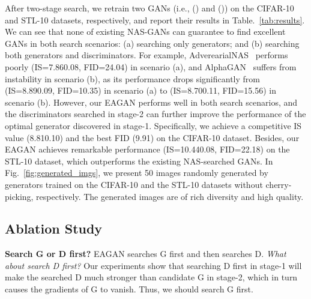 \documentclass[runningheads]{llncs}
\begin{document}
After two-stage search, we retrain two GANs (i.e., () and ()) on the CIFAR-10 and STL-10 datasets, respectively, and report their results in Table.~\ref{tab:results}. We can see that none of existing NAS-GANs can guarantee to find excellent GANs in both search scenarios: (a) searching only generators; and (b) searching both generators and discriminators. For example, AdverearialNAS~\cite{Adversarialnas} performs poorly (IS=7.860.08, FID=24.04) in scenario (a), and AlphaGAN~\cite{AlphaGAN} suffers from instability in scenario (b), as its performance drops significantly from (IS=8.890.09, FID=10.35) in scenario (a) to (IS=8.700.11, FID=15.56) in scenario (b). However, our EAGAN performs well in both search scenarios, and the discriminators searched in stage-2 can further improve the performance of the optimal generator discovered in stage-1. Specifically, we achieve a competitive IS value (8.810.10) and the best FID (9.91) on the CIFAR-10 dataset. Besides, our EAGAN achieves remarkable performance (IS=10.440.08, FID=22.18) on the STL-10 dataset, which outperforms the existing NAS-searched GANs. In Fig.~\ref{fig:generated_imgs}, we present 50 images randomly generated by generators trained on the CIFAR-10 and the STL-10 datasets without cherry-picking, respectively. The generated images are of rich diversity and high quality.




\begin{figure*}[h!]
    \centering
    \caption{The generated images by EAGAN in random without cherry-picking.}
    \label{fig:generated_imgs}
\end{figure*}





















\subsection{Ablation Study}\label{sec:ablation}




\textbf{Search G or D first?} EAGAN searches G first and then searches D. \textit{What about search D first?} Our experiments show that searching D first in stage-1 will make the searched D much stronger than candidate G in stage-2, which in turn causes the gradients of G to vanish. Thus, we should search G first.
\end{document}
